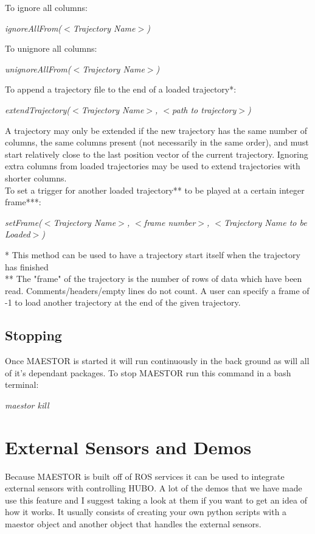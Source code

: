 \documentclass[12pt]{article}
\begin{document}
To ignore all columns:
    \begin{center}
    	\textit{ignoreAllFrom($<$Trajectory Name$>$)}
	\end{center}

To unignore all columns: 
    \begin{center}
    	\textit{unignoreAllFrom($<$Trajectory Name$>$)}
	\end{center}

To append a trajectory file to the end of a loaded trajectory*:
    \begin{center}
    	\textit{extendTrajectory($<$Trajectory Name$>$, $<$path to trajectory$>$)}
    \end{center}

\noindent * A trajectory may only be extended if the new trajectory has the same number of columns, the same columns present (not 
necessarily in the same order), and must start relatively close to the last position vector of the current trajectory.
Ignoring extra columns from loaded trajectories may be used to extend trajectories with shorter columns.\\

\noindent To set a trigger for another loaded trajectory** to be played at a certain integer frame***:
    \begin{center}
    	\textit{setFrame($<$Trajectory Name$>$, $<$frame number$>$, $<$Trajectory Name to be Loaded$>$)}
    \end{center}

\noindent ** This method can be used to have a trajectory start itself when the trajectory has finished\\

\noindent *** The "frame" of the trajectory is the number of rows of data which have been read. Comments/headers/empty lines do not count.
A user can specify a frame of -1 to load another trajectory at the end of the given trajectory.

\subsection{Stopping}

Once MAESTOR is started it will run continuously in the back ground as will all of it's dependant packages. To stop MAESTOR run this command in a bash terminal:
	\begin{center}
		\textit{maestor kill}
	\end{center}

	
\section{External Sensors and Demos}
	Because MAESTOR is built off of ROS services it can be used to integrate external sensors with controlling HUBO. A lot of the demos that we have made use this feature and I suggest taking a look at them if you want to get an idea of how it works. It usually consists of creating your own python scripts with a maestor object and another object that handles the external sensors. \\
\end{document}

